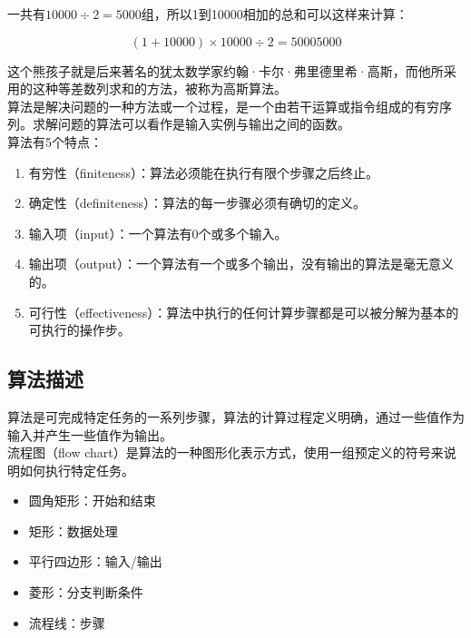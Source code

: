 一共有$ 10000 \div 2 = 5000 $组，所以1到10000相加的总和可以这样来计算：

$$
	(1 + 10000) \times 10000 \div 2 = 50005000
$$

这个熊孩子就是后来著名的犹太数学家约翰·卡尔·弗里德里希·高斯，而他所采用的这种等差数列求和的方法，被称为高斯算法。\\

算法是解决问题的一种方法或一个过程，是一个由若干运算或指令组成的有穷序列。求解问题的算法可以看作是输入实例与输出之间的函数。\\

算法有5个特点：

\begin{enumerate}
	\item 有穷性（finiteness）：算法必须能在执行有限个步骤之后终止。
	\item 确定性（definiteness）：算法的每一步骤必须有确切的定义。
	\item 输入项（input）：一个算法有0个或多个输入。
	\item 输出项（output）：一个算法有一个或多个输出，没有输出的算法是毫无意义的。
	\item 可行性（effectiveness）：算法中执行的任何计算步骤都是可以被分解为基本的可执行的操作步。
\end{enumerate}

\vspace{0.5cm}

\subsection{算法描述}

算法是可完成特定任务的一系列步骤，算法的计算过程定义明确，通过一些值作为输入并产生一些值作为输出。\\

流程图（flow chart）是算法的一种图形化表示方式，使用一组预定义的符号来说明如何执行特定任务。

\begin{itemize}
	\item 圆角矩形：开始和结束
	\item 矩形：数据处理
	\item 平行四边形：输入/输出
	\item 菱形：分支判断条件
	\item 流程线：步骤
\end{itemize}


